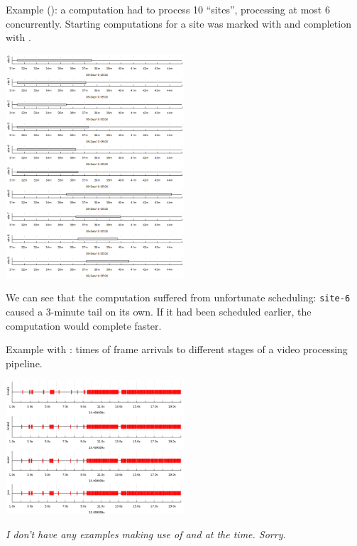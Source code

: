 \documentclass{article}
\begin{document}
Example (): a computation had to process 10 ``sites'', processing at most 6 concurrently. Starting computations for a site was marked with  and completion with .

\centerline{\includegraphics[width=0.5\textwidth]{pics/tplot/event.png}}

We can see that the computation suffered from unfortunate scheduling: \texttt{site-6} caused a 3-minute tail on its own. If it had been scheduled earlier, the computation would complete faster.

\pagebreak
Example with : times of frame arrivals to different stages of a video processing pipeline.

\centerline{\includegraphics[width=0.5\textwidth]{pics/tplot/thedeemon-event.png}}

\emph{I don't have any examples making use of  and  at the time. Sorry.}
\end{document}

